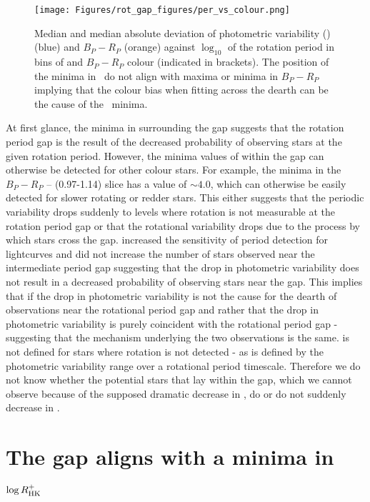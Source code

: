 \begin{figure}
\centering
  \texttt{[image: Figures/rot\_gap\_figures/per\_vs\_colour.png]}
  \caption[Median and median absolute deviation of photometric variability (\rper{}) (blue) and $B_P-R_P$ (orange) against $\log_{10}$ of the rotation period in bins of and \gaia{} $B_P-R_P$ colour.]{
  Median and median absolute deviation of photometric variability (\rper{}) (blue) and $B_P-R_P$ (orange) against $\log_{10}$ of the rotation period in bins of and \gaia{} $B_P-R_P$ colour (indicated in brackets). The position of the minima in \rper{} \ do not align with maxima or minima in $B_P-R_P$ implying that the colour bias when fitting across the dearth can be the cause of the \rper{} \ minima.}
  \label{fig:colour_rper}
\end{figure}

At first glance, the minima in \rper{} surrounding the gap suggests that the rotation period gap is the result of the decreased probability of observing stars at the given rotation period.
However, the minima values of \rper{} within the gap can otherwise be detected for other colour stars.
For example, the minima in the $B_P-R_P$ -- (0.97-1.14) slice has a \rper{} value of $\sim 4.0$, which can otherwise be easily detected for slower rotating or redder stars.
This either suggests that the periodic variability drops suddenly to levels where rotation is not measurable at the rotation period gap or that the rotational variability drops due to the process by which stars cross the gap. 
 \citet{santos_surface_2021} increased the sensitivity of period detection for \kepler{} lightcurves and did not increase the number of stars observed near the intermediate period gap suggesting that the drop in photometric variability does not result in a decreased probability of observing stars near the gap.
This implies that if the drop in photometric variability is not the cause for the dearth of observations near the rotational period gap and rather that the drop in photometric variability is purely coincident with the rotational period gap - suggesting that the mechanism underlying the two observations is the same.
\rper{} is not defined for stars where rotation is not detected - as \rper{} is defined by the photometric variability range over a rotational period timescale.
Therefore we do not know whether the potential stars that lay within the gap, which we cannot observe because of the supposed dramatic decrease in \rper{}, do or do not suddenly decrease in \rper{}.

\section{The gap aligns with a minima in $\log R^{+}_{\rm{HK}}$ }
\label{sec:minima_rhk}

